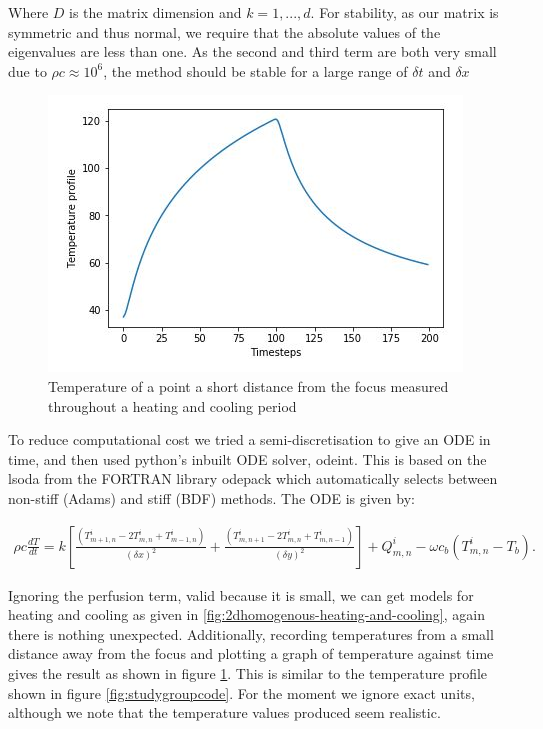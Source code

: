 \documentclass[11pt]{article} %
\begin{document}
Where $D$ is the matrix dimension and $k=1,...,d$. For stability, as our matrix is symmetric and thus normal, we require that the absolute values of the  eigenvalues are less than one. As the second and third term are both very small due to $\rho c \approx 10^6$, the method  should be stable for a large range of $ \delta t $ and $ \delta x $


\begin{figure}
	\centering
	\includegraphics[width=0.7\linewidth]{Report_images/study_group_code_2D_model}
	\caption{Temperature of a point a short distance from the focus measured throughout a heating and cooling period}
	\label{fig:studygroupcode2dmodel}
\end{figure}


To reduce computational cost we tried a semi-discretisation to give an ODE in time, and then used python's inbuilt ODE solver, odeint. This is based on the  lsoda from the FORTRAN library odepack which automatically selects between non-stiff (Adams) and stiff (BDF) methods. The ODE is given by:

\begin{eqnarray}
\rho c \frac{dT}{dt}= k\left[  \frac{(T^i_{m+1,n}-2T^i_{m,n}+T^i_{m-1,n})}{(\delta x)^2}+\frac{(T^i_{m,n+1}-2T^i_{m,n}+T^i_{m,n-1})}{(\delta y)^2}\right] +Q^i_{m,n}-\omega c_b(T^i_{m,n}-T_b).
\end{eqnarray}

Ignoring the perfusion term, valid because it is small, we can get models for heating and cooling as given in \ref{fig:2dhomogenous-heating-and-cooling}, again there is nothing unexpected. Additionally, recording temperatures from a small distance away from the focus and plotting a graph of temperature against time gives the result as shown in figure \ref{fig:studygroupcode2dmodel}. This is similar to the temperature profile shown in figure \ref{fig:studygroupcode}. For the moment we ignore exact units, although we note that the temperature values produced seem realistic. 
\end{document}
